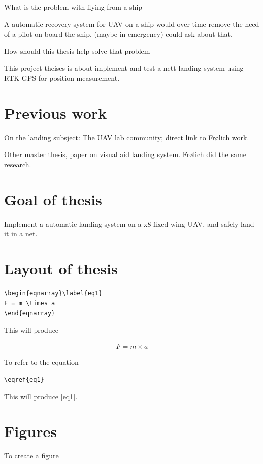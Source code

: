 What is the problem with flying from a ship

A automatic recovery system for UAV on a ship would over time remove the need of a pilot on-board the ship. (maybe in emergency) could ask about that.  

How should this thesis help solve that problem

This project theises is about implement and test a nett landing system using RTK-GPS for position measurement.

\section{Previous work}
On the landing subsject: The UAV lab community; direct link to Frølich work. 

Other master thesis, paper on visual aid landing system. Frølich did the same research.
\section{Goal of thesis}
Implement a automatic landing system on a x8 fixed wing UAV, and safely land it in a net. 
\section{Layout of thesis}
\begin{verbatim}
\begin{eqnarray}\label{eq1}
F = m \times a
\end{eqnarray}
\end{verbatim}

\noindent This will produce

\begin{eqnarray}\label{eq1}
F = m \times a
\end{eqnarray}

\noindent To refer to the equation

\begin{verbatim}
\eqref{eq1}
\end{verbatim}

\noindent This will produce \eqref{eq1}.


\section{Figures}
To create a figure

